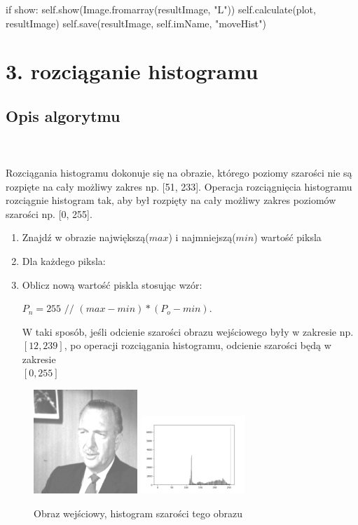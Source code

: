 \documentclass[final,a4paper,openany,12pt]{mwbk}
\begin{document}
\noindent if show: \newline
self.show(Image.fromarray(resultImage, "L")) \newline
self.calculate(plot, resultImage) \newline
self.save(resultImage, self.imName, "moveHist") \newline
\newpage





\section*{3. rozciąganie histogramu}
\subsection*{Opis algorytmu}
\hfill
\\\\
\indent Rozciągania histogramu dokonuje się na obrazie, którego poziomy szarości nie są rozpięte na cały możliwy zakres np.
[51, 233]. Operacja rozciągnięcia histogramu rozciągnie histogram tak, aby był rozpięty na cały możliwy zakres poziomów szarości np. [0, 255].
\begin{enumerate}
	\item Znajdź w obrazie największą($max$) i najmniejszą($min$) wartość piksla
	\item Dla każdego piksla:
	\item Oblicz nową wartość piskla stosując wzór:\\
	\centerline{$P_n = 255$ $//$ $(max - min) * (P_o - min)$.}
	W taki sposób, jeśli odcienie szarości obrazu wejściowego były w zakresie
	np. $[12, 239]$, po operacji rozciągania histogramu, odcienie szarości będą w zakresie\\
	$[0, 255]$
\end{enumerate}

\begin{figure}[H]
	\begin{center}
		\includegraphics[width=0.35\textwidth]{gentelman_gray_moveHist_result}
		\includegraphics[width=0.35\textwidth]{gentelman_gray_moveHist_histogram}
	\end{center}
	\caption{Obraz wejściowy, histogram szarości tego obrazu}
\end{figure}
\end{document}
